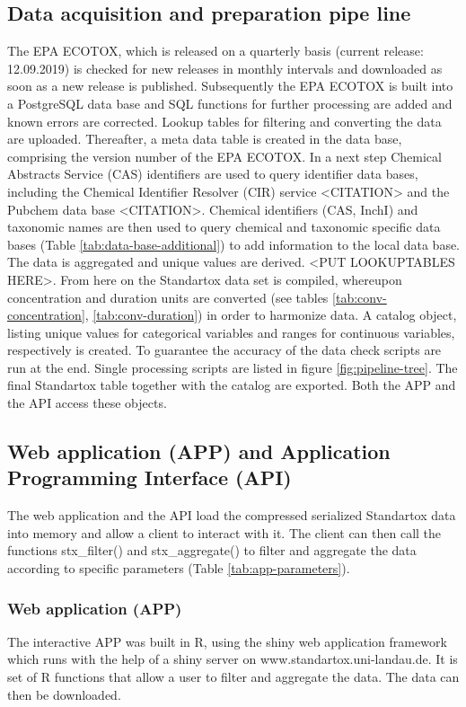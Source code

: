 \subsection*{Data acquisition and preparation pipe line}
The EPA ECOTOX, which is released on a quarterly basis (current release: 12.09.2019) is checked for new releases in monthly intervals and downloaded as soon as a new release is published. Subsequently the EPA ECOTOX is built into a PostgreSQL data base and SQL functions for further processing are added and known errors are corrected. Lookup tables for filtering and converting the data are uploaded. Thereafter, a meta data table is created in the data base, comprising the version number of the EPA ECOTOX. In a next step Chemical Abstracts Service (CAS) identifiers are used to query identifier data bases, including the Chemical Identifier Resolver (CIR) service <CITATION> and the Pubchem data base <CITATION>. Chemical identifiers (CAS, InchI) and taxonomic names are then used to query chemical and taxonomic specific data bases (Table \ref{tab:data-base-additional}) to add information to the local data base. The data is aggregated and unique values are derived. <PUT LOOKUPTABLES HERE>. From here on the Standartox data set is compiled, whereupon concentration and duration units are converted (see tables \ref{tab:conv-concentration}, \ref{tab:conv-duration}) in order to harmonize data. A catalog object, listing unique values for categorical variables and ranges for continuous variables, respectively is created. To guarantee the accuracy of the data check scripts are run at the end. Single processing scripts are listed in figure \ref{fig:pipeline-tree}. The final Standartox table together with the catalog are exported. Both the APP and the API access these objects.

\subsection*{Web application (APP) and Application Programming Interface (API)}

The web application and the API load the compressed serialized Standartox data into memory and allow a client to interact with it. The client can then call the functions stx\_filter() and stx\_aggregate() to filter and aggregate the data according to specific parameters (Table \ref{tab:app-parameters}).

\subsubsection*{Web application (APP)}
The interactive APP was built in R, using the shiny web application framework \citep{chang_shiny_2018} which runs with the help of a shiny server \citep{HOW-TO-CITE-SHINY-SERVER} on www.standartox.uni-landau.de. It is set of R functions that allow a user to filter and aggregate the data. The data can then be downloaded.

